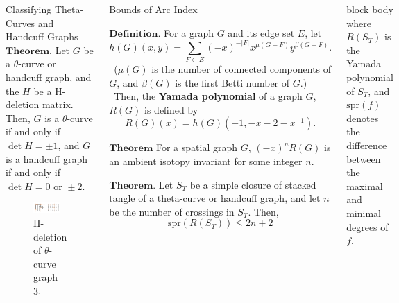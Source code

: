 \documentclass[final]{beamer}
\begin{document}
\begin{frame}[t]
\begin{columns}[t]
\begin{block}{Classifying Theta-Curves and Handcuff Graphs}
    \vspace{1em}
    $\mathbf{Theorem.}$ Let $G$ be a $\theta$-curve or handcuff graph, and the $H$ be a H-deletion matrix. Then,
    $G$ is a $\theta$-curve if and only if $\det{H} = \pm 1$, and $G$ is a handcuff graph if and only if $\det{H} = 0 \text{ or } \pm2$.
    \begin{figure}[h]
        \centering
        \includegraphics[width=0.8\textwidth]{figure/Hdeletion.png}
        \caption{H-deletion of $\theta$-curve graph $3_1$}
      \end{figure}
  \end{block}


  \begin{block}{Bounds of Arc Index}

    $\mathbf{Definition.}$ For a graph $G$ and its edge set $E$, let
    \[ h(G)(x, y) = \sum_{F \subset E} (-x)^{-|F|} x^{\mu(G-F)} y^{\beta(G-F)}. \]
    \ ($\mu(G)$ is the number of connected components of $G$, and $\beta(G)$ is the first Betti number of $G$.) \\
    \ Then, the \textbf{Yamada polynomial} of a graph $G$, $R(G)$ is defined by
    \[ R(G)(x) = h(G)(-1, -x-2-x^{-1}). \]

    \vspace{1em}

    $\mathbf{Theorem}$ For a spatial graph $G$, $(-x)^n R(G)$ is an ambient isotopy invariant for some integer $n$.

    \vspace{1em}
    
    $\mathbf{Theorem.}$ Let $S_T$ be a simple closure of stacked tangle of a theta-curve or handcuff graph, and let $n$ be the number of crossings in $S_T$. Then,
     \[ \mathrm{spr}(R(S_T)) \leq 2n+2 \]
  \end{block}

  \begin{beamercolorbox}[rounded=true, shadow=false, wd=\textwidth]{block body}
    where $R(S_T)$ is the Yamada polynomial of $S_T$, and $\mathrm{spr}(f)$ denotes the difference between the maximal and minimal degrees of $f$. \\


\end{beamercolorbox}
\end{columns}
\end{frame}
\end{document}
